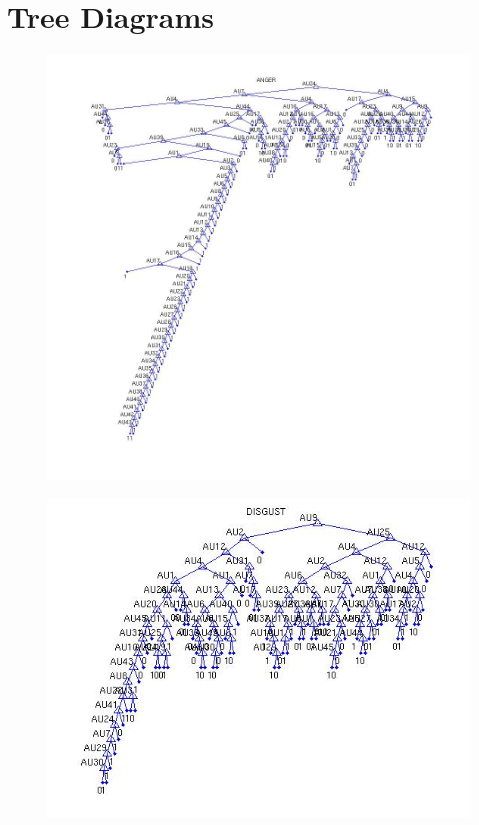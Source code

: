 \documentclass[11pt]{amsart}
\begin{document}
\section{Tree Diagrams}
\begin{figure}[h]
\begin{center}
\includegraphics[scale=0.4]{anger.jpg}
\end{center}
\end{figure}

\begin{figure}[!h]
\begin{center}
\includegraphics[scale=0.7]{disgust.jpg}
\end{center}
\end{figure}
\end{document}
